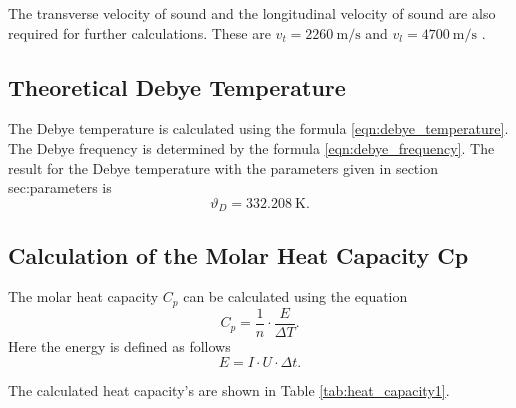 The transverse velocity of sound and the longitudinal velocity of sound are also required for further calculations.
These are $v_t = \qty{2260}{\meter \per \second}$ and $v_l = \qty{4700}{\meter \per \second}$ \cite{molar_heat}.

\subsection{Theoretical Debye Temperature}
\label{sec:theoretical_debye_temperature}

The Debye temperature is calculated using the formula \ref{eqn:debye_temperature}.
The Debye frequency is determined by the formula \ref{eqn:debye_frequency}.
The result for the Debye temperature with the parameters given in section {sec:parameters} is
\begin{equation*}
	\vartheta_D = \qty{332.208}{\kelvin}.
\end{equation*}


\subsection{Calculation of the Molar Heat Capacity Cp}
\label{sec:calculation_of_the_molar_heat_capacity_cp}

The molar heat capacity $C_p$ can be calculated using the equation
\begin{equation}
	C_p = \frac{1}{n} \cdot \frac{E}{\Delta T}.
\end{equation}
Here the energy is defined as follows
\begin{equation}
	E = I \cdot U \cdot \Delta t.
\end{equation}

The calculated heat capacity's are shown in Table \ref{tab:heat_capacity1}.

